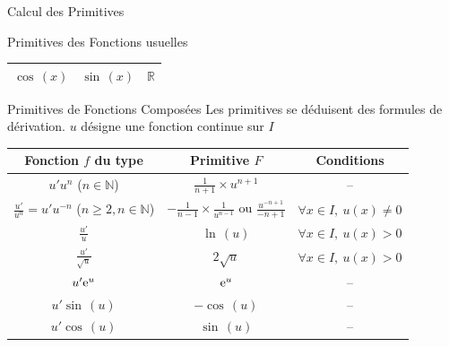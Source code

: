 \documentclass{coursbook}
\begin{document}
\begin{Gpartie}{Calcul des Primitives}
\begin{Spartie}{Primitives des Fonctions usuelles}
\begin{table}[H]
\begin{tabular}[c]{ @{}*{3}{C}@{} }
                    $\cos\,(x)$                                   & $\sin\,(x)$                                                         & $\mathbb{R}$ \\ \bottomrule
                \end{tabular}
            \end{table}
        \end{Spartie}
        \begin{Spartie}{Primitives de Fonctions Composées}
            Les primitives se déduisent des formules de dérivation. $u$ désigne une fonction continue sur $I$
            \begin{table}[H] \centering {}
                \begin{tabular}[c]{ @{}*{3}{C}@{} } \toprule
                    Fonction $f$ du type                                    & Primitive $F$                                                             & Conditions  \\ \midrule
                    $u'u^n$ ($n\in\mathbb{N}$)                              & $\frac{1}{n+1}\times u^{n+1}$                                             & \---\\
                    $\frac{u'}{u^n}=u'u^{-n}$ ($n\geq2, n\in\mathbb{N}$)   & $-\frac{1}{n-1}\times\frac{1}{u^{n-1}}$ ou $\frac{u^{-n+1}}{-n+1}$        & $\forall x\in I,\ u(x)\neq0$ \\
                    $\frac{u'}{u}$                                          & $\ln\,(u)$                                                                  & $\forall x\in I,\ u(x)>0$ \\
                    $\frac{u'}{\sqrt{u}}$                                   & $2\sqrt{u}$                                                               & $\forall x\in I,\ u(x)>0$ \\
                    $u'\mathrm{e}^u$                                                 & $\mathrm{e}^u$                                                                     & \---\\
                    $u'\sin\,(u)$                                             & $-\cos\,(u)$                                                                & \---\\
                    $u'\cos\,(u)$                                             & $\sin\,(u)$                                                                 & \---\\ \bottomrule
                \end{tabular}

\end{table}
\end{Spartie}
\end{Gpartie}
\end{document}
